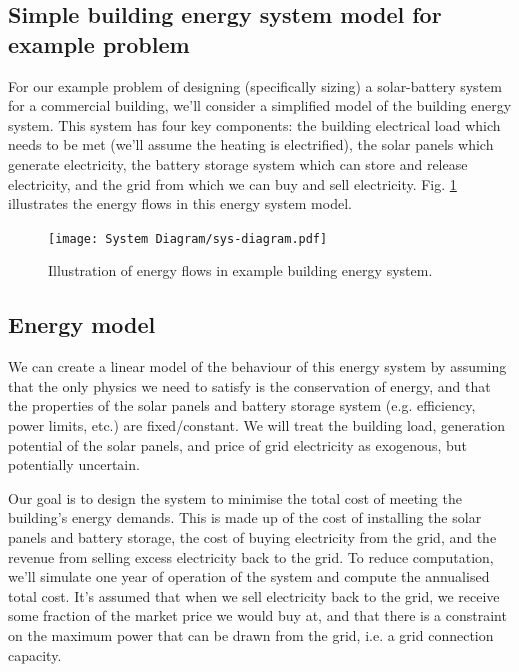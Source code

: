 

\newpage
\begin{subappendices}

\section{Simple building energy system model for example problem} \label{app:example-problem-formulation}


For our example problem of designing (specifically sizing) a solar-battery system for a commercial building, we'll consider a simplified model of the building energy system. This system has four key components: the building electrical load which needs to be met (we'll assume the heating is electrified), the solar panels which generate electricity, the battery storage system which can store and release electricity, and the grid from which we can buy and sell electricity. Fig. \ref{fig:example-system-diagram} illustrates the energy flows in this energy system model.

\begin{figure}[h]
    \centering
    \texttt{[image: System Diagram/sys-diagram.pdf]}
    \caption{Illustration of energy flows in example building energy system.} \label{fig:example-system-diagram}
\end{figure}

\subsection{Energy model}

We can create a linear model of the behaviour of this energy system by assuming that the only physics we need to satisfy is the conservation of energy, and that the properties of the solar panels and battery storage system (e.g. efficiency, power limits, etc.) are fixed/constant. We will treat the building load, generation potential of the solar panels, and price of grid electricity as exogenous, but potentially uncertain.

Our goal is to design the system to minimise the total cost of meeting the building's energy demands. This is made up of the cost of installing the solar panels and battery storage, the cost of buying electricity from the grid, and the revenue from selling excess electricity back to the grid. To reduce computation, we'll simulate one year of operation of the system and compute the annualised total cost. It's assumed that when we sell electricity back to the grid, we receive some fraction of the market price we would buy at, and that there is a constraint on the maximum power that can be drawn from the grid, i.e. a grid connection capacity.


\end{subappendices}
